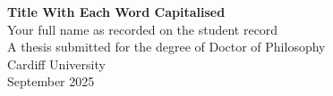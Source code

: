 \documentclass[a4paper,oneside,onecolumn,openright,12pt]{book} %
\begin{document}
\frontmatter

\begin{titlepage}

\begin{center}
\vspace*{3ex}
\textbf{\Huge Title With Each Word Capitalised}\\
\vfill
\LARGE Your full name as recorded on the student record\\
\vfill
\LARGE A thesis submitted for the degree of Doctor of Philosophy\\
\vfill
\LARGE Cardiff University\\
\LARGE September 2025\\
\end{center}

\end{titlepage}

\cleardoublepage



\def\baselinestretch{1.5}\normalfont

\tableofcontents

\listoffigures
\listoftables
\listofalgorithms


\cleardoublepage

\cleardoublepage

\cleardoublepage

\mainmatter



\backmatter

\def\baselinestretch{1}\normalfont
\def\baselinestretch{1.24}\normalfont



\appendix
\renewcommand{\thesection}{\Alph{section}}

\renewcommand\thefigure{\thesection\arabic{figure}}
\renewcommand\thetable{\thesection\arabic{table}}


\end{document}
